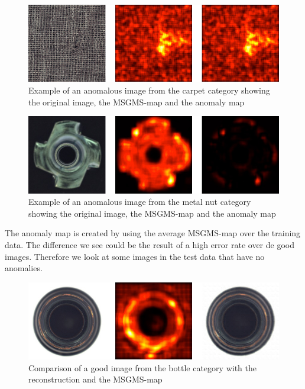 \begin{figure}[ht!]
\centering
\includegraphics[width=\textwidth]{imgs/samples/carpet-ano-msgms.jpg}
\caption{Example of an anomalous image from the carpet category showing the original image, the MSGMS-map and the anomaly map}
\label{fig:discussion:carpet-msgms}
\end{figure}

\begin{figure}[ht!]
\centering
\includegraphics[width=\textwidth]{imgs/samples/metal-nut-ano-msgms.jpg}
\caption{Example of an anomalous image from the metal nut category showing the original image, the MSGMS-map and the anomaly map}
\label{fig:discussion:metal-nut-msgms}
\end{figure}

The anomaly map is created by using the average MSGMS-map over the training data. The difference we see could be the result of a high error rate over de good images. Therefore we look at some images in the test data that have no anomalies.

\begin{figure}[ht!]
\centering
\includegraphics[width=\textwidth]{imgs/samples/bottle-good.jpg}
\caption{Comparison of a good image from the bottle category with the reconstruction and the MSGMS-map}
\label{fig:discussion:bottle-good}
\end{figure}

